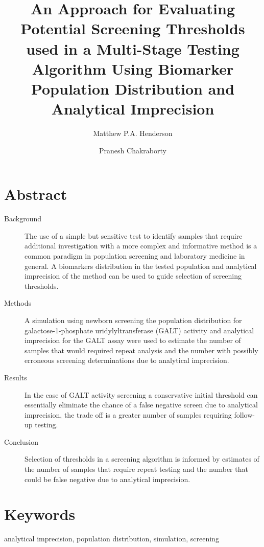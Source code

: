 \documentclass[review]{elsarticle}
\date{}
\title{}
\begin{document}
\makeatletter
\newcommand{\citeprocitem}[2]{\hyper@linkstart{cite}{citeproc_bib_item_#1}#2\hyper@linkend}
\makeatother



\begin{frontmatter}
\title{An Approach for Evaluating Potential Screening Thresholds used in a Multi-Stage Testing Algorithm Using Biomarker Population Distribution and Analytical Imprecision}
\author[NSO, UoO]{Matthew P.A. Henderson}
\author[NSO, UO]{Pranesh Chakraborty}
\address[NSO]{Newborn Screening Ontario, Children's Hospital of Eastern Ontario,Canada}
\address[UoO]{Department of Medicine, University of Ottawa,Canada} 
\end{frontmatter}

\section*{Abstract}
\label{sec:org17d378b}
\begin{description}
\item[{Background}] The use of a simple but sensitive test to identify
samples that require additional investigation with a more complex
and informative method is a common paradigm in population screening
and laboratory medicine in general. A biomarkers distribution in the
tested population and analytical imprecision of the method can be
used to guide selection of screening thresholds.
\item[{Methods}] A simulation using newborn screening the population
distribution for galactose-1-phosphate uridylyltransferase (GALT)
activity and analytical imprecision for the GALT assay were used to
estimate the number of samples that would required repeat analysis
and the number with possibly erroneous screening determinations due
to analytical imprecision.
\item[{Results}] In the case of GALT activity screening a conservative
initial threshold can essentially eliminate the chance of a false
negative screen due to analytical imprecision, the trade off is a
greater number of samples requiring follow-up testing.
\item[{Conclusion}] Selection of thresholds in a screening algorithm is
informed by estimates of the number of samples that require repeat
testing and the number that could be false negative due to
analytical imprecision.
\end{description}
\section*{Keywords}
\label{sec:org09bb9ac}
analytical imprecision, population distribution, simulation, screening
\end{document}
